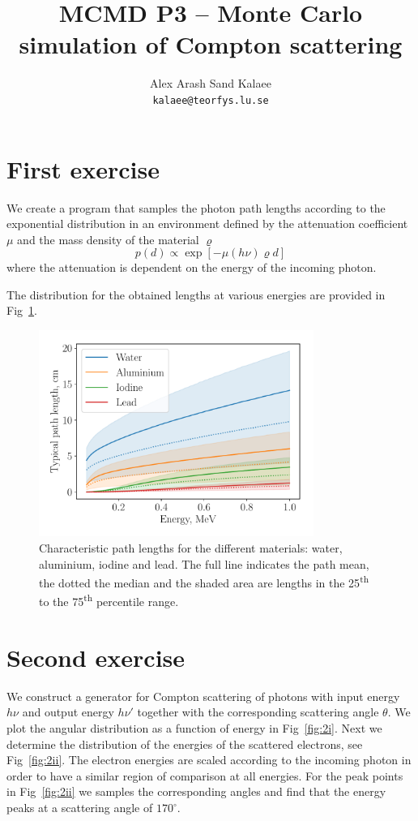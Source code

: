 \documentclass{article}
\begin{document}
\title{MCMD P3 -- Monte Carlo simulation of Compton scattering}
\author{Alex Arash Sand Kalaee\\ \texttt{kalaee@teorfys.lu.se}}
\maketitle
\section{First exercise}
We create a program that samples the photon path lengths according to the
exponential distribution in an environment defined by the attenuation
coefficient $\mu$ and the mass density of the material $\varrho$
\begin{equation}
p(d) \propto \exp\left[-\mu(h\nu)\varrho d\right]
\end{equation}
where the attenuation is dependent on the energy of the incoming photon.

The distribution for the obtained lengths at various energies are provided in
Fig~\ref{fig:1}.

\begin{figure}
\centering
\includegraphics[width=0.8\textwidth]{first.pdf}
\caption{Characteristic path lengths  for the different materials:
water, aluminium, iodine and lead. The full line indicates the path mean,
the dotted the median and the shaded area are lengths in the
25\textsuperscript{th} to the 75\textsuperscript{th} percentile range.}
\label{fig:1}
\end{figure}

\section{Second exercise}
We construct a generator for Compton scattering of photons with input energy
$h\nu$ and output energy $h\nu'$ together with the corresponding scattering
angle $\theta$.
We plot the angular distribution as a function of energy in Fig~\ref{fig:2i}.
Next we determine the distribution of the energies of the scattered electrons,
see Fig~\ref{fig:2ii}. The electron energies are scaled according to the
incoming photon in order to have a similar region of comparison at all energies.
For the peak points in Fig~\ref{fig:2ii} we samples the corresponding angles
and find that the energy peaks at a scattering angle of $170^\circ$.
\end{document}
